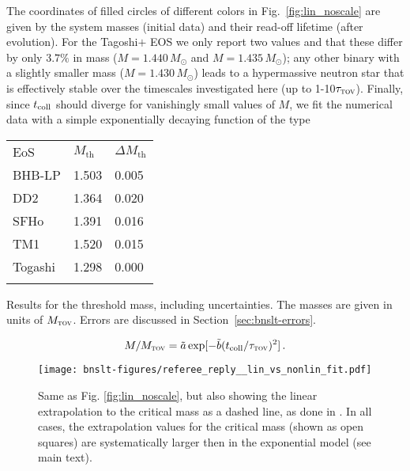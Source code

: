 The coordinates of filled circles of different colors in 
Fig.~\ref{fig:lin_noscale} are given by the system masses (initial data)
and their read-off lifetime (after evolution).
For the Tagoshi$+$ EOS we only report two values and that these differ by
only $3.7\%$ in mass (\ie $M=1.440\,M_{\odot}$ and $M=1.435\,M_{\odot}$);
any other binary with a slightly smaller mass (\eg $M=1.430\,M_{\odot}$)
leads to a hypermassive neutron star that is effectively stable over the
timescales investigated here (\ie up to 1-10$\tau_{\textsc{tov}}$).
Finally, since $t_{\rm{coll}}$ should diverge for
vanishingly small values of $M$, we fit the numerical data with a simple
exponentially decaying function of the type
\begin{margintable}
	\centering
	\begin{tabular}{lR{1cm}R{1.4cm}}
		\toprule
		EoS
		& $M_\text{th}$
		& $\Delta M_\text{th}$
		\\
		\colrule
		BHB-LP  &  1.503 & 0.005 \\
		DD2     &  1.364 & 0.020 \\
		SFHo    &  1.391 & 0.016 \\
		TM1     &  1.520 & 0.015 \\
		Togashi &  1.298 & 0.000 \\
		\botrule
	\end{tabular}
	\caption[
	  Numerical results of BNS prompt collapse treshold mass
	]{Results for the threshold mass, including uncertainties.	
		The masses are given in units of $M_{\textsc{tov}}$. Errors are
		discussed in Section~\ref{sec:bnslt-errors}.
	}\label{table:Mtresh}
\end{margintable}
\begin{equation}\label{eq:bnslt-gauss}
M/M_{\textsc{tov}} =
\tilde{a}\exp[-\tilde{b} ( t_{\rm coll}/\tau_{\textsc{tov}} )^{2}]
\,.
\end{equation}
\begin{figure}[b]
	\caption[
	Lifetimes, exponential vs. linear extrapolation,
	taken from private referee communication about \cite{Koeppel2019}.
	]{Same as Fig. \protect\ref{fig:lin_noscale}, but also showing the linear extrapolation
		to the critical mass as a dashed line, as done in \cite{Bauswein2013}. In all
		cases, the extrapolation values for the critical mass (shown as open squares)
		are systematically larger then in the exponential model (see main text).
	}\label{fig:lin_exp_comp_lifetimes}
	\texttt{[image: bnslt-figures/referee\_reply\_\_lin\_vs\_nonlin\_fit.pdf]}
\end{figure}
